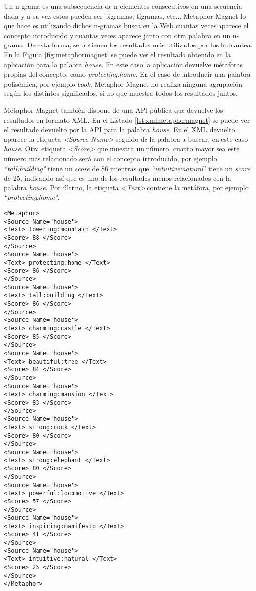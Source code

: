 Un n-grama \citep{ngrama1999} es una subsecuencia de n elementos consecutivos en una secuencia dada y a su vez estos pueden ser bigramas, tigramas, etc... Metaphor Magnet lo que hace es utilizando dichos n-gramas busca en la Web cuantas veces aparece el concepto introducido y cuantas veces aparece junto con otra palabra en un n-grama. De esta forma, se obtienen los resultados más utilizados por los hablantea. En la Figura \ref{fig:metaphormagnet} se puede ver el resultado obtenido en la aplicación para la palabra \textit{house}. En este caso la aplicación devuelve métaforas propias del concepto, como \textit{protecting:home}.
En el caso de introducir una palabra polisémica, por ejemplo \textit{book}, Metaphor Magnet no realiza ninguna agrupación según los distintos significados, si no que muestra todos los resultados juntos.

Metaphor Magnet también dispone de una API pública que devuelve los resultados en formato XML. En el Listado \ref{lst:xmlmetaphormagnet} se puede ver el resultado devuelto por la API para la palabra \textit{house}. En el XML devuelto aparece la etiqueta \textit{<Source Name>} seguido de la palabra a buscar, en este caso \textit{house}. Otra etiqueta \textit{<Score>} que muestra un número, cuanto mayor sea este número más relacionado será con el concepto introducido, por ejemplo \textit{``tall:building"}  tiene un \textit{score} de 86 mientras que \textit{``intuitive:natural"} tiene un \textit{score} de 25, indicando así que es uno de los resultados menos relacionados con la palabra \textit{house}. Por último, la etiqueta \textit{<Text>} contiene la metáfora, por ejemplo \textit{``protecting:home"}.



\lstset{language=XML}
\begin{lstlisting}[caption= XML devuelto por Metaphor Magnet para la palabra \textit{house}, label={lst:xmlmetaphormagnet}, frame=single]
<Metaphor>
<Source Name="house">
<Text> towering:mountain </Text>
<Score> 88 </Score>
</Source>
<Source Name="house">
<Text> protecting:home </Text>
<Score> 86 </Score>
</Source>
<Source Name="house">
<Text> tall:building </Text>
<Score> 86 </Score>
</Source>
<Source Name="house">
<Text> charming:castle </Text>
<Score> 85 </Score>
</Source>
<Source Name="house">
<Text> beautiful:tree </Text>
<Score> 84 </Score>
</Source>
<Source Name="house">
<Text> charming:mansion </Text>
<Score> 83 </Score>
</Source>
<Source Name="house">
<Text> strong:rock </Text>
<Score> 80 </Score>
</Source>
<Source Name="house">
<Text> strong:elephant </Text>
<Score> 80 </Score>
</Source>
<Source Name="house">
<Text> powerful:locomotive </Text>
<Score> 57 </Score>
</Source>
<Source Name="house">
<Text> inspiring:manifesto </Text>
<Score> 41 </Score>
</Source>
<Source Name="house">
<Text> intuitive:natural </Text>
<Score> 25 </Score>
</Source>
</Metaphor>
\end{lstlisting}




